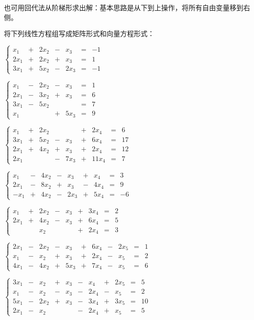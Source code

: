 也可用回代法从阶梯形求出解：基本思路是从下到上操作，将所有自由变量移到右侧。
\begin{problemset}
  \item 将下列线性方程组写成矩阵形式和向量方程形式：
  \begin{probenumerate}
    \item $\left\{\begin{array}{rrrrrrrr}x_1&+&2x_2&-&x_3&=&-1\\2x_1&+&2x_2&+&x_3&=&1\\3x_1&+&5x_2&-&2x_3&=&-1\end{array}\right.$
    \item $\left\{\begin{array}{rrrrrrrr}x_1&-&2x_2&-&x_3&=&1\\2x_1&-&3x_2&+&x_3&=&6\\3x_1&-&5x_2&&&=&7\\x_1&&&+&5x_3&=&9\end{array}\right.$
    \item $\left\{\begin{array}{rrrrrrrrrr}x_1&+&2x_2&&&+&2x_4&=&6\\3x_1&+&5x_2&-&x_3&+&6x_4&=&17\\2x_1&+&4x_2&+&x_3&+&2x_4&=&12\\2x_1&&&-&7x_3&+&11x_4&=&7\end{array}\right.$
    \item $\left\{\begin{array}{rrrrrrrrrr}x_1&-&4x_2&-&x_3&+&x_4&=&3\\2x_1&-&8x_2&+&x_3&-&4x_4&=&9\\-x_1&+&4x_2&-&2x_3&+&5x_4&=&-6\end{array}\right.$
    \item $\left\{\begin{array}{rrrrrrrrrr}x_1&+&2x_2&-&x_3&+&3x_4&=&2\\2x_1&+&4x_2&-&x_3&+&6x_4&=&5\\&&x_2&&&+&2x_4&=&3\end{array}\right.$
    \item $\left\{\begin{array}{rrrrrrrrrrr}2x_1&-&2x_2&-&x_3&+&6x_4&-&2x_5&=&1\\x_1&-&x_2&+&x_3&+&2x_4&-&x_5&=&2\\4x_1&-&4x_2&+&5x_3&+&7x_4&-&x_5&=&6\end{array}\right.$
    \item $\left\{\begin{array}{rrrrrrrrrrrr}3x_1&-&x_2&+&x_3&-&x_4&+&2x_5&=&5\\x_1&-&x_2&-&x_3&-&2x_4&-&x_5&=&2\\5x_1&-&2x_2&+&x_3&-&3x_4&+&3x_5&=&10\\2x_1&-&x_2&&&-&2x_4&+&x_5&=&5\end{array}\right.$

\end{probenumerate}
\end{problemset}
